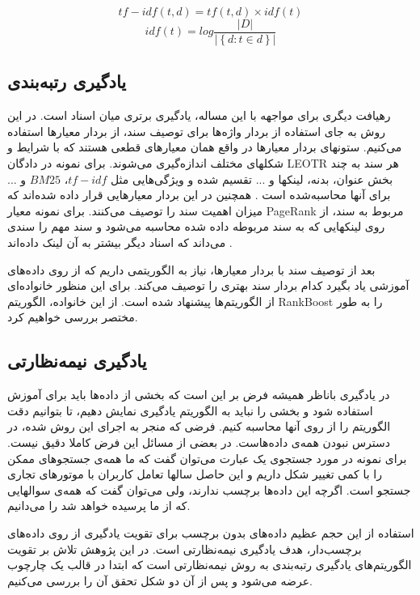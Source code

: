 \documentclass{article}
\begin{document}
\begin{equation} \label{eq:tf-idf}
tf-idf(t,d)=tf(t,d)\times idf(t)
\end{equation}
$$ idf(t)=log\frac {\left| D \right|}{\left| \left\{d:t\in d \right\} \right|} $$

\subsection{یادگیری رتبه‌بندی}
رهیافت دیگری برای مواجهه با این مساله، یادگیری برتری میان اسناد است. در این روش به جای استفاده از بردار واژه‌ها برای توصیف سند، از بردار معیارها استفاده می‌کنیم. ستونهای بردار معیارها در واقع همان معیارهای قطعی هستند که با شرایط و شکلهای مختلف اندازه‌گیری می‌شوند. برای نمونه در دادگان LEOTR هر سند به چند بخش عنوان، بدنه، لینکها و ... تقسیم شده و ویژگی‌هایی مثل $tf-idf$، ‌$BM25$ و ... برای آنها محاسبه‌شده است \cite{letor}. همچنین در این بردار معیارهایی قرار داده شده‌اند که میزان اهمیت سند را توصیف می‌کنند. برای نمونه معیار PageRank مربوط به سند، از روی لینکهایی که به سند مربوطه داده شده محاسبه می‌شود و سند مهم را سندی می‌داند که اسناد دیگر بیشتر به آن لینک داده‌اند \cite{pagerank}.

بعد از توصیف سند با بردار معیارها، نیاز به الگوریتمی داریم که از روی داده‌های آموزشی یاد بگیرد کدام بردار سند بهتری را توصیف می‌کند. برای این منظور خانواده‌ای از الگوریتم‌ها پیشنهاد شده است. از این خانواده، الگوریتم RankBoost را به طور مختصر بررسی خواهیم کرد.

\subsection{یادگیری نیمه‌نظارتی}
در یادگیری باناظر همیشه فرض بر این است که بخشی از داده‌ها باید برای آموزش استفاده شود و بخشی را نباید به الگوریتم یادگیری نمایش دهیم، تا بتوانیم دقت الگوریتم را از روی آنها محاسبه کنیم. فرضی که منجر به اجرای این روش شده، در دسترس نبودن همه‌ی داده‌هاست. در بعضی از مسائل این فرض کاملا دقیق نیست. برای نمونه در مورد جستجوی یک عبارت می‌توان گفت که ما همه‌ی جستجوهای ممکن را با کمی تغییر شکل داریم و این حاصل سالها تعامل کاربران با موتورهای تجاری جستجو است. اگرچه این داده‌ها برچسب ندارند، ولی می‌توان گفت که همه‌ی سوالهایی که از ما پرسیده خواهد شد را می‌دانیم.

استفاده از این حجم عظیم داده‌های بدون برچسب برای تقویت یادگیری از روی داده‌های برچسب‌دار، هدف یادگیری نیمه‌نظارتی است. در این پژوهش تلاش بر تقویت الگوریتم‌های یادگیری رتبه‌بندی به روش نیمه‌نظارتی است که ابتدا در قالب یک چارچوب عرضه می‌شود و پس از آن دو شکل تحقق آن را بررسی می‌کنیم.
\end{document}
